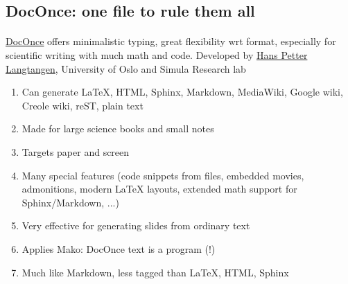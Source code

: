 \documentclass[%
twoside,                 %
final,                   %
10pt]{article}
\begin{document}
\subsection*{DocOnce: one file to rule them all}

\paragraph{}

\href{{http://hplgit.github.io/doconce/doc/web/index.html}}{DocOnce} offers minimalistic typing, great flexibility wrt format, especially for scientific writing with much math and code. Developed by \href{{http://hplgit.github.io/homepage/index.html}}{Hans Petter Langtangen}, University of Oslo and Simula Research lab

\begin{enumerate}
\item Can generate {\LaTeX}, HTML, Sphinx, Markdown, MediaWiki, Google wiki, Creole wiki, reST, plain text

\item Made for large science books and small notes

\item Targets paper and screen

\item Many special features (code snippets from files, embedded movies, admonitions, modern {\LaTeX} layouts, extended math support for Sphinx/Markdown, ...)

\item Very effective for generating slides from ordinary text

\item Applies Mako: DocOnce text is a program (!)

\item Much like Markdown, less tagged than {\LaTeX}, HTML, Sphinx
\end{enumerate}

\noindent

























\printindex
\end{document}

